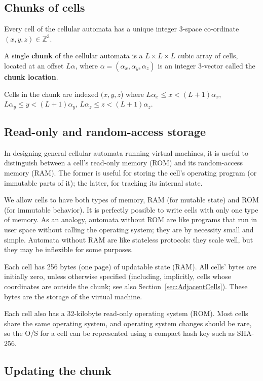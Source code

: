\documentclass{article}
\begin{document}
\subsection{Chunks of cells}

Every cell of the cellular automata has a unique integer 3-space co-ordinate $(x,y,z) \in \mathbb{Z}^3$.

A single {\bf chunk} of the cellular automata is a $L \times L \times L$ cubic array of cells,
located at an offset $L\alpha$,
where $\alpha = (\alpha_x,\alpha_y,\alpha_z)$ is an integer 3-vector called the {\bf chunk location}.

Cells in the chunk are indexed $(x,y,z$) where
$L\alpha_x \leq x < (L+1)\alpha_x$,
$L\alpha_y \leq y < (L+1)\alpha_y$,
$L\alpha_z \leq z < (L+1)\alpha_z$.

\subsection{Read-only and random-access storage}
\label{sec:Storage}

In designing general cellular automata running virtual machines,
it is useful to distinguish between a cell's read-only memory (ROM)
and its random-access memory (RAM).
The former is useful for storing the cell's operating program (or immutable parts of it); the latter, for tracking its internal state.

We allow cells to have both types of memory, RAM (for mutable state) and ROM (for immutable behavior).
It is perfectly possible to write cells with only one type of memory.
As an analogy, automata without ROM are like programs that run in user space without calling the operating system; they are by necessity small and simple.
Automata without RAM are like stateless protocols: they scale well, but they may be inflexible for some purposes.

Each cell has 256 bytes (one page) of updatable state (RAM).
All cells' bytes are initially zero, unless otherwise specified
(including, implicitly, cells whose coordinates are outside the chunk; see also Section~\ref{sec:AdjacentCells}).
These bytes are the storage of the virtual machine.

Each cell also has a 32-kilobyte read-only operating system (ROM).
Most cells share the same operating system, and operating system changes should be rare,
so the O/S for a cell can be represented using a compact hash key such as SHA-256.

\subsection{Updating the chunk}
\label{sec:UpdatingChunk}
\end{document}
